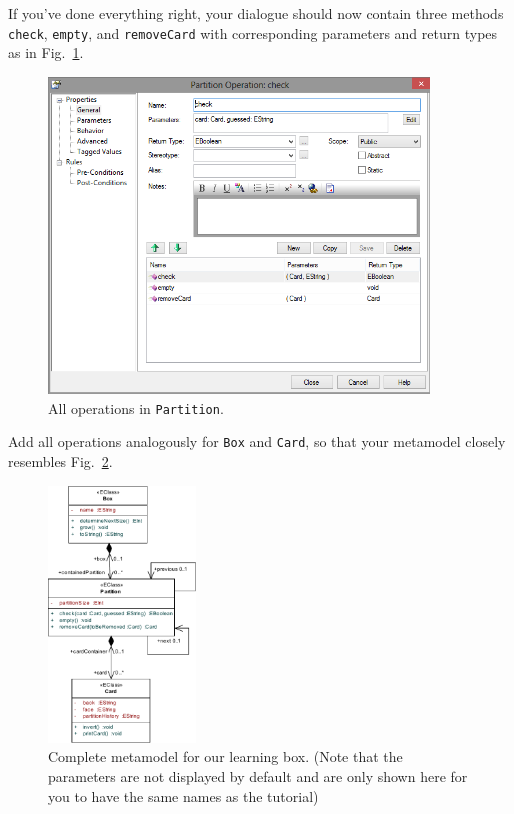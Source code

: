 If you've done everything right, your dialogue should now contain three methods \texttt{check}, \texttt{empty}, and \texttt{removeCard} with corresponding parameters and return types as in Fig.~\ref{fig:operation_partition}.
\begin{figure}[htbp]
	\centering
  \includegraphics[width=0.9\textwidth]{pics/memBoxBilder/memBox39}
	\caption{All operations in \texttt{Partition}.}
	\label{fig:operation_partition}
\end{figure}

Add all operations analogously for \texttt{Box} and \texttt{Card}, so that your metamodel closely resembles Fig.~\ref{fig:metamodel_complete}.

\begin{figure}[htbp]
	\centering
  \includegraphics[width=0.35\textwidth]{pics/memBoxBilder/memBox44}
	\caption[Complete metamodel for our learning box.]{Complete metamodel for our learning box. (Note that the parameters are not displayed by default and are only shown here for you to have the same names as the tutorial)}
	\label{fig:metamodel_complete}
\end{figure}

